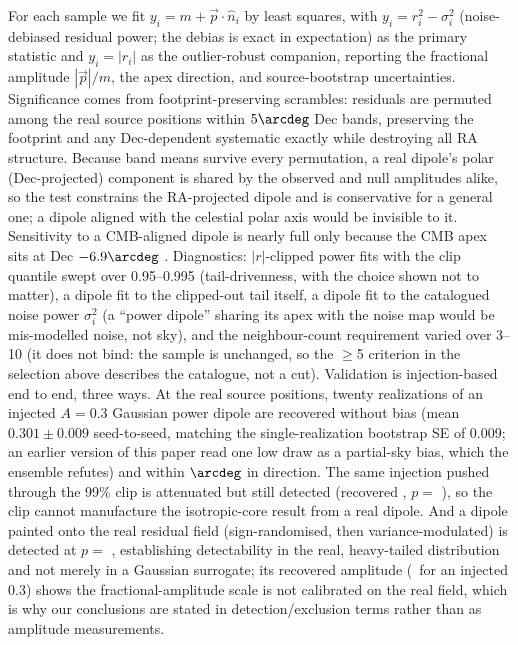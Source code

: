 \documentclass[twocolumn]{aastex631}
\begin{document}
For each sample we fit $y_i = m + \vec p\cdot\hat n_i$ by least squares, with
$y_i = r_i^2 - \sigma_i^2$ (noise-debiased residual power; the debias is exact in expectation)
as the primary statistic and $y_i = |r_i|$ as the outlier-robust companion, reporting the
fractional amplitude $|\vec p|/m$, the apex direction, and source-bootstrap uncertainties.
Significance comes from footprint-preserving scrambles: residuals are permuted among the real
source positions within $5\arcdeg$ Dec bands, preserving the footprint and any Dec-dependent
systematic exactly while destroying all RA structure. Because band means survive every
permutation, a real dipole's polar (Dec-projected) component is shared by the observed and null
amplitudes alike, so the test constrains the RA-projected dipole and is conservative for a
general one; a dipole aligned with the celestial polar axis would be invisible to it.
Sensitivity to a CMB-aligned dipole is nearly full only because the CMB apex sits at Dec
$-6.9\arcdeg$ \citep[$(167.94\arcdeg, -6.94\arcdeg)$ equatorial;][]
{planck2020}. Diagnostics: $|r|$-clipped power fits with the clip quantile swept over 0.95--0.995
(tail-drivenness, with the choice shown not to matter), a dipole fit to the clipped-out tail
itself, a dipole fit to the catalogued noise power $\sigma_i^2$ (a ``power dipole'' sharing its
apex with the noise map would be mis-modelled noise, not sky), and the neighbour-count
requirement varied over 3--10 (it does not bind: the sample is unchanged, so the $\ge$5
criterion in the selection above describes the catalogue, not a cut). Validation is
injection-based end to end, three ways. At the real source positions, twenty realizations of an
injected $A=0.3$ Gaussian power dipole are recovered without bias (mean $0.301\pm0.009$
seed-to-seed, matching the single-realization bootstrap SE of 0.009; an earlier version of this
paper read one low draw as a partial-sky bias, which the ensemble refutes) and within
\rmdRealInjSepTrue$\arcdeg$ in direction. The same injection pushed through the 99\% clip is
attenuated but still detected (recovered \rmdRealInjClipAmp, $p=$ \rmdRealInjClipP), so the
clip cannot manufacture the isotropic-core result from a real dipole. And a dipole painted onto
the real residual field (sign-randomised, then variance-modulated) is detected at
$p=$ \rmdRealInjRealP, establishing detectability in the real, heavy-tailed distribution and
not merely in a Gaussian surrogate; its recovered amplitude (\rmdRealInjRealAmp\ for an
injected 0.3) shows the fractional-amplitude scale is not calibrated on the real field, which is
why our conclusions are stated in detection/exclusion terms rather than as amplitude
measurements.
\end{document}
